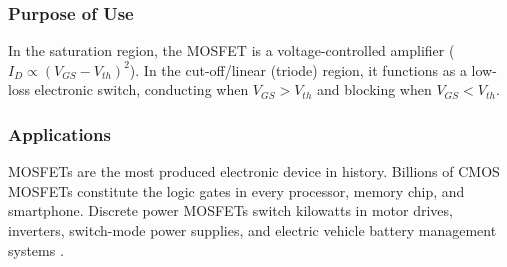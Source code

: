 \subsubsection*{Purpose of Use}
In the saturation region, the MOSFET is a voltage-controlled amplifier ($I_D \propto
(V_{GS}-V_{th})^2$). In the cut-off/linear (triode) region, it functions as a low-loss
electronic switch, conducting when $V_{GS} > V_{th}$ and blocking when $V_{GS} < V_{th}$.

\subsubsection*{Applications}
MOSFETs are the most produced electronic device in history. Billions of CMOS MOSFETs
constitute the logic gates in every processor, memory chip, and smartphone. Discrete
power MOSFETs switch kilowatts in motor drives, inverters, switch-mode power supplies,
and electric vehicle battery management systems \cite{wiki:mosfet}.
